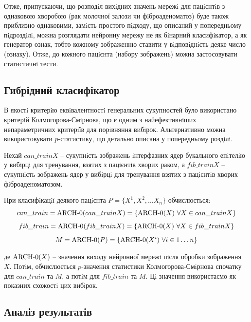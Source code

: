 Отже, припускаючи, що розподiл вихiдних значень мережi для пацiєнтiв з однаковою хворобою (рак молочної залози чи фiброаденоматоз) буде також приблизно однаковими, замiсть простого пiдходу, що описаний у попередньому пiдроздiлi, можна розглядати нейронну мережу не як бiнарний класифiкатор, а як генератор ознак, тобто кожному зображенню ставити у вiдповiднiсть деяке число (ознаку). Отже, до кожного пацiєнта (набору зображень) можна застосовувати статистичнi тести.



\subsection{Гибрідний класифікатор}

В якостi критерiю еквiвалентностi генеральних сукупностей було використано критерiй Колмогорова-Смiрнова, що є одним з найефективнiших непараметричних критерiїв для порiвняння вибiрок. Альтернативно можна використовувати \(p\)-статистику, що детально описана у попередньому роздiлi. 

Нехай \(can\_trainX\) -- сукупнiсть зображень iнтерфазних ядер букального епiтелiю у вибiрцi для тренування, взятих з пацiєнтiв хворих раком, а \(fib\_trainX\) -- сукупнiсть зображень ядер у вибiрцi для тренування взятих з пацiєнтiв хворих фiброаденоматозом.  

При класифiкацiї деякого пацiєнта \(P = \{X^1, X^2, \dots X_n\} \) обчислюється: 
\begin{equation*}
can\_train = \textup{ARCH-0}(can\_trainX) = \{\textup{ARCH-0}(X)\,\, \forall X \in can\_trainX\}
\end{equation*}
\begin{equation*}
fib\_train = \textup{ARCH-0}(fib\_trainX) = \{\textup{ARCH-0}(X)\,\, \forall X \in fib\_trainX\}
\end{equation*}
\begin{equation*}
M = \textup{ARCH-0}(P) = \{\textup{ARCH-0}(X^i)\,\, \forall i \in 1 \dots n\}
\end{equation*}

де \(\textup{ARCH-0}(X)\) -- значення виходу нейронної мережi пiсля обробки зображення \(X\). Потiм, обчислюється \(p\)-значення статистики Колмогорова-Смiрнова спочатку для \(can\_train\) та \(M\), а потiм для \(fib\_train\) та \(M\). Цi значення використаємо як показних схожостi цих вибiрок.

\subsection{Аналіз результатів}

